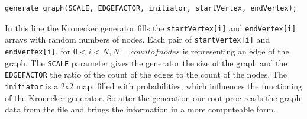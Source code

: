 \documentclass[12pt,a4paper]{article}
\begin{document}
\begin{lstlisting}
generate_graph(SCALE, EDGEFACTOR, initiator, startVertex, endVertex);
\end{lstlisting}

In this line the Kronecker generator fills the \lstinline{startVertex[i]} and \lstinline{endVertex[i]} arrays with random numbers of nodes. Each pair of \lstinline{startVertex[i]} and \lstinline{endVertex[i]}, for \( 0 < i < N, N = count of nodes \) is representing an edge of the graph. The \lstinline{SCALE} parameter gives the generator the size of the graph and the \lstinline{EDGEFACTOR} the ratio of the count of the edges to the count of the nodes. The \lstinline{initiator} is a 2x2 map, filled with probabilities, which influences the functioning of the Kronecker generator. So after the generation our root proc reads the graph data from the file and brings the information in a more computeable form.
\end{document}
